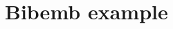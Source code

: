 \documentclass{article}
\begin{document}
 
\section{Bibemb example}
\lipsum[2-4]
\nocite{*}

\printbibliography
\end{document}
